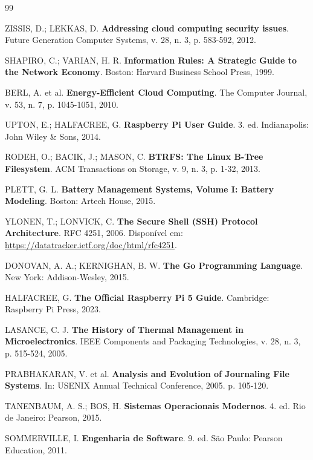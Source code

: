 \documentclass[a4paper,12pt]{article}
\begin{document}
\begin{thebibliography}{99}

ZISSIS, D.; LEKKAS, D. \textbf{Addressing cloud computing security issues}. Future Generation Computer Systems, v. 28, n. 3, p. 583-592, 2012.

SHAPIRO, C.; VARIAN, H. R. \textbf{Information Rules: A Strategic Guide to the Network Economy}. Boston: Harvard Business School Press, 1999.

BERL, A. et al. \textbf{Energy-Efficient Cloud Computing}. The Computer Journal, v. 53, n. 7, p. 1045-1051, 2010.

UPTON, E.; HALFACREE, G. \textbf{Raspberry Pi User Guide}. 3. ed. Indianapolis: John Wiley \& Sons, 2014.


RODEH, O.; BACIK, J.; MASON, C. \textbf{BTRFS: The Linux B-Tree Filesystem}. ACM Transactions on Storage, v. 9, n. 3, p. 1-32, 2013.

PLETT, G. L. \textbf{Battery Management Systems, Volume I: Battery Modeling}. Boston: Artech House, 2015.

YLONEN, T.; LONVICK, C. \textbf{The Secure Shell (SSH) Protocol Architecture}. RFC 4251, 2006. Disponível em: \url{https://datatracker.ietf.org/doc/html/rfc4251}.

DONOVAN, A. A.; KERNIGHAN, B. W. \textbf{The Go Programming Language}. New York: Addison-Wesley, 2015.

HALFACREE, G. \textbf{The Official Raspberry Pi 5 Guide}. Cambridge: Raspberry Pi Press, 2023.

LASANCE, C. J. \textbf{The History of Thermal Management in Microelectronics}. IEEE Components and Packaging Technologies, v. 28, n. 3, p. 515-524, 2005.

PRABHAKARAN, V. et al. \textbf{Analysis and Evolution of Journaling File Systems}. In: USENIX Annual Technical Conference, 2005. p. 105-120.

TANENBAUM, A. S.; BOS, H. \textbf{Sistemas Operacionais Modernos}. 4. ed. Rio de Janeiro: Pearson, 2015.

SOMMERVILLE, I. \textbf{Engenharia de Software}. 9. ed. São Paulo: Pearson Education, 2011.

\end{thebibliography}
\end{document}
